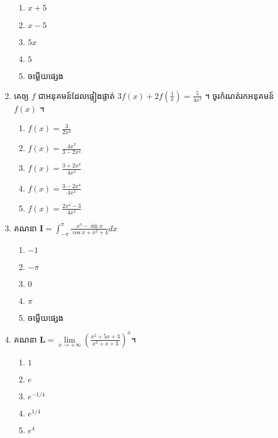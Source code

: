 \documentclass[12pt, a4paper]{article}
\begin{document}
\begin{enumerate}[m]
\begin{enumerate}[k,5]
			\item $x+5$
			\item $x-5$
			\item $5x$
			\item $5$
			\item ចម្លើយផ្សេង
	\end{enumerate}
	{\color{blue}\hrulefill}
	\item គេឲ្យ $f$ ជាអនុគមន៍ដែលផ្ទៀងផ្ទាត់ $3f(x)+2f\left(\frac{1}{x}\right)=\frac{5}{4x^2}$ ។ ចូរកំណត់រកអនុគមន៍ $f(x)$ ។ 
	\begin{enumerate}[k,3]
		\item $f(x)=\frac{3}{2x^4}$
		\item $f(x)=\frac{4x^2}{3-2x^4}$
		\item $f(x)=\frac{3+2x^4}{4x^2}$
		\item $f(x)=\frac{3-2x^4}{4x^2}$
		\item $f(x)=\frac{2x^4-3}{4x^2}$
	\end{enumerate}
	{\color{blue}\hrulefill}
	\item គណនា $\mathbf{I}=\int_{-\pi}^{\pi}\frac{x^3-\sin x}{\cos x+x^2+4}dx$
	\begin{enumerate}[k,5]
		\item $-1$
		\item $-\pi$
		\item $0$
		\item $\pi$
		\item ចម្លើយផ្សេង
	\end{enumerate}
	{\color{blue}\hrulefill}
	\item គណនា $\mathbf{L}=\lim\limits_{x\to+\infty}\left(\frac{x^2+5x+3}{x^2+x+3}\right)^x$។
	\begin{enumerate}[k,5]
		\item $1$
		\item $e$
		\item $e^{-1/4}$
		\item $e^{1/4}$
		\item $e^{4}$
	\end{enumerate}
	{\color{blue}\hrulefill}
\end{enumerate}
\newpage
\maketitle\koc
{\color{blue}\hrulefill}
\end{document}
